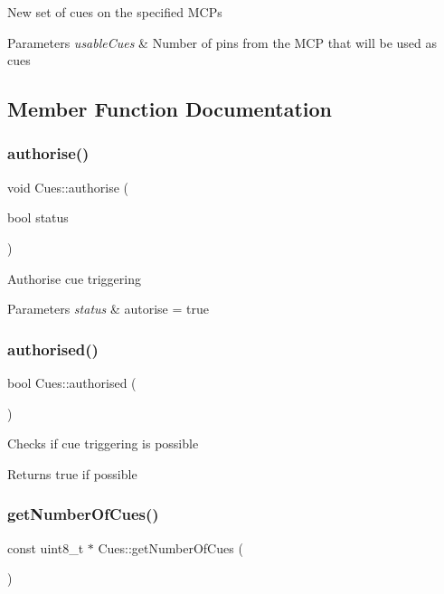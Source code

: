 New set of cues on the specified M\+C\+Ps 
\begin{DoxyParams}{Parameters}
{\em usable\+Cues} & Number of pins from the M\+CP that will be used as cues \\
\hline
\end{DoxyParams}


\subsection{Member Function Documentation}
\mbox{\label{class_cues_ac16c59fc0bf1d78551702aae1c6890ed}} 
\subsubsection{\texorpdfstring{authorise()}{authorise()}}
{\footnotesize\ttfamily void Cues\+::authorise (\begin{DoxyParamCaption}\item[{bool}]{status }\end{DoxyParamCaption})}

Authorise cue triggering 
\begin{DoxyParams}{Parameters}
{\em status} & autorise = true \\
\hline
\end{DoxyParams}
\mbox{\label{class_cues_a2d6a154816bb8c21300ef28cbecf70bf}} 
\subsubsection{\texorpdfstring{authorised()}{authorised()}}
{\footnotesize\ttfamily bool Cues\+::authorised (\begin{DoxyParamCaption}{ }\end{DoxyParamCaption})}

Checks if cue triggering is possible \begin{DoxyReturn}{Returns}
true if possible 
\end{DoxyReturn}
\mbox{\label{class_cues_aec66f445c05bb8888fe03a9e63a5326b}} 
\subsubsection{\texorpdfstring{get\+Number\+Of\+Cues()}{getNumberOfCues()}}
{\footnotesize\ttfamily const uint8\+\_\+t $\ast$ Cues\+::get\+Number\+Of\+Cues (\begin{DoxyParamCaption}{ }\end{DoxyParamCaption})}


